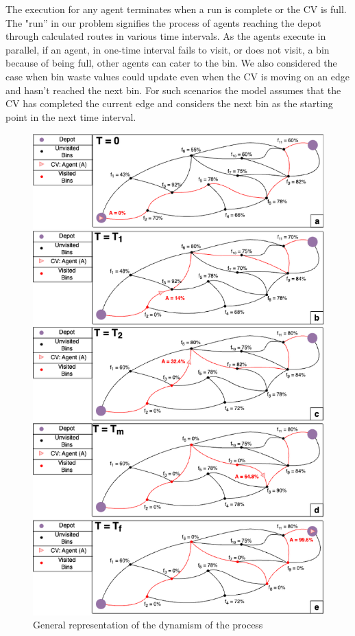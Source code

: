 \documentclass[12pt]{article}
\begin{document}
The execution for any agent terminates when a run is complete or the CV is full. The "run” in our problem signifies the process of agents reaching the depot through calculated routes in various time intervals. As the agents execute in parallel, if an agent, in one-time interval fails to visit, or does not visit, a bin because of being full, other agents can cater to the bin. We also considered the case when bin waste values could update even when the CV is moving on an edge and hasn't reached the next bin. For such scenarios the model assumes that the CV has completed the current edge and considers the next bin as the starting point in the next time interval.  

\begin{figure}[H]
    \centering
    \includegraphics[scale=0.6]{ExplanationFigure.png}
    \caption{General representation of the dynamism of the process}\label{fige}
\end{figure}
\end{document}
